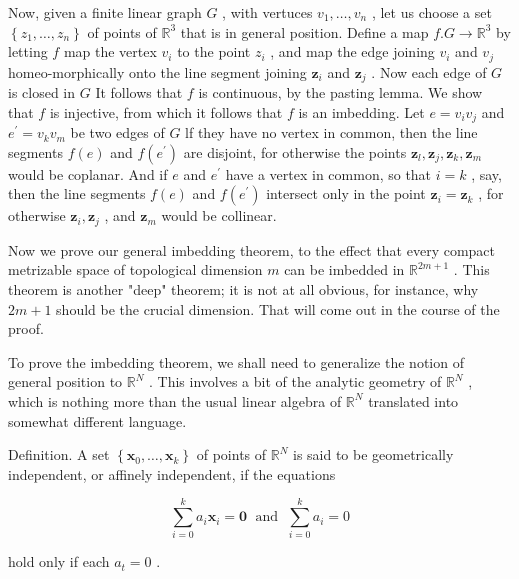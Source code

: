 \documentclass[10pt]{article}
\begin{document}
Now, given a finite linear graph \(G\) , with vertuces \({v}_{1},\ldots ,{v}_{n}\) , let us choose a set \(\left\{  {{z}_{1},\ldots ,{z}_{n}}\right\}\) of points of \({\mathbb{R}}^{3}\) that is in general position. Define a map \(f.G \rightarrow  {\mathbb{R}}^{3}\) by letting \(f\) map the vertex \({v}_{i}\) to the point \({z}_{i}\) , and map the edge joining \({v}_{i}\) and \({v}_{j}\) homeo-morphically onto the line segment joining \({\mathbf{z}}_{i}\) and \({\mathbf{z}}_{j}\) . Now each edge of \(G\) is closed in \(G\) It follows that \(f\) is continuous, by the pasting lemma. We show that \(f\) is injective, from which it follows that \(f\) is an imbedding. Let \(e = {v}_{i}{v}_{j}\) and \({e}^{\prime } = {v}_{k}{v}_{m}\) be two edges of \(G\) lf they have no vertex in common, then the line segments \(f\left( e\right)\) and \(f\left( {e}^{\prime }\right)\) are disjoint, for otherwise the points \({\mathbf{z}}_{l},{\mathbf{z}}_{j},{\mathbf{z}}_{k},{\mathbf{z}}_{m}\) would be coplanar. And if \(e\) and \({e}^{\prime }\) have a vertex in common, so that \(i = k\) , say, then the line segments \(f\left( e\right)\) and \(f\left( {e}^{\prime }\right)\) intersect only in the point \({\mathbf{z}}_{i} = {\mathbf{z}}_{k}\) , for otherwise \({\mathbf{z}}_{i},{\mathbf{z}}_{j}\) , and \({\mathbf{z}}_{m}\) would be collinear.

Now we prove our general imbedding theorem, to the effect that every compact metrizable space of topological dimension \(m\) can be imbedded in \({\mathbb{R}}^{{2m} + 1}\) . This theorem is another "deep" theorem; it is not at all obvious, for instance, why \({2m} + 1\) should be the crucial dimension. That will come out in the course of the proof.

To prove the imbedding theorem, we shall need to generalize the notion of general position to \({\mathbb{R}}^{N}\) . This involves a bit of the analytic geometry of \({\mathbb{R}}^{N}\) , which is nothing more than the usual linear algebra of \({\mathbb{R}}^{N}\) translated into somewhat different language.

Definition. A set \(\left\{  {{\mathbf{x}}_{0},\ldots ,{\mathbf{x}}_{k}}\right\}\) of points of \({\mathbb{R}}^{N}\) is said to be geometrically independent, or affinely independent, if the equations

\[
\mathop{\sum }\limits_{{i = 0}}^{k}{a}_{i}{\mathbf{x}}_{i} = \mathbf{0}\;\text{ and }\;\mathop{\sum }\limits_{{i = 0}}^{k}{a}_{i} = 0
\]

hold only if each \({a}_{t} = 0\) .
\end{document}

